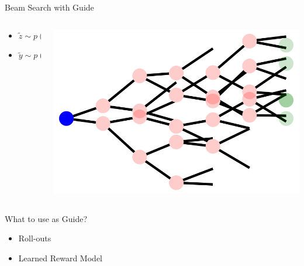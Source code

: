 \documentclass[14pt,aspectratio=169]{beamer}
\begin{document}
\begin{frame}{Beam Search with Guide}
	\begin{columns}
		\begin{column}{0.5\linewidth}
			\begin{itemize}
				\item $\tilde{z} \sim p(z | x)$
				\item $\tilde{y} \sim p(y | x, \tilde{z})$
			\end{itemize}
		\end{column}
		\begin{column}{0.5\linewidth}
			\includegraphics[width=\textwidth]{images/beam.png}
		\end{column}
	\end{columns}
\end{frame}


\begin{frame}{What to use as Guide?}
	\begin{itemize}
		\item Roll-outs
		\item Learned Reward Model
	\end{itemize}
\end{frame}
\end{document}
